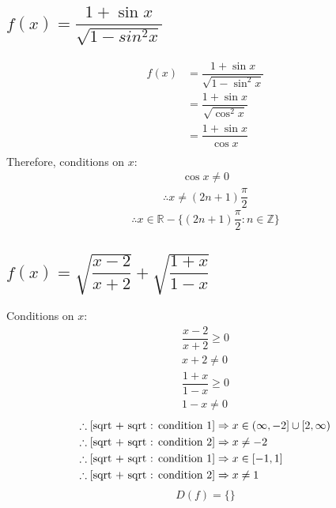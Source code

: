 \documentclass[fleqn, a4paper, 10pt]{article}
\begin{document}
\subsection{$f(x) = \dfrac{1 + \sin x}{\sqrt{1 - sin^2 x}}$}

\begin{align*}
	f(x) &= \dfrac{1 + \sin x}{\sqrt{1 - \sin^2 x}}\\
	&= \dfrac{1 + \sin x}{\sqrt{\cos^2 x}}\\
	&= \dfrac{1 + \sin x}{\cos x}\\
\end{align*}
Therefore, conditions on $x$:
\begin{align}
	\cos x \neq 0
\end{align}
\begin{align*}
	\therefore x \neq (2n+1)\dfrac{\pi}{2}
\end{align*}
\begin{equation*}
	\boxed{\therefore x \in \mathbb{R} - \{(2n+1)\dfrac{\pi}{2} : n \in \mathbb{Z}\}}
\end{equation*}

\subsection{$f(x) = \sqrt{\dfrac{x - 2}{x + 2}} + \sqrt{\dfrac{1 + x}{1 - x}}$}

Conditions on $x$:
\begin{align}
	\dfrac{x - 2}{x + 2} \geq 0 \label{sqrt + sqrt : condition 1}\\
	x + 2 \neq 0 \label{sqrt + sqrt : condition 2}\\
	\dfrac{1 + x}{1 - x} \geq 0 \label{sqrt + sqrt : condition 3}\\
	1 - x \neq 0 \label{sqrt + sqrt : condition 4}
\end{align}
\begin{align*}
	\therefore \eqref{sqrt + sqrt : condition 1} \Rightarrow x &\in (\infty, -2] \cup [2, \infty)\\
	\therefore \eqref{sqrt + sqrt : condition 2} \Rightarrow x &\neq -2\\
	\therefore \eqref{sqrt + sqrt : condition 1} \Rightarrow x &\in [-1,1]\\
	\therefore \eqref{sqrt + sqrt : condition 2} \Rightarrow x &\neq 1\\
\end{align*}
\begin{equation*}
	\boxed{D(f) = \{\}}
\end{equation*}
\end{document}
